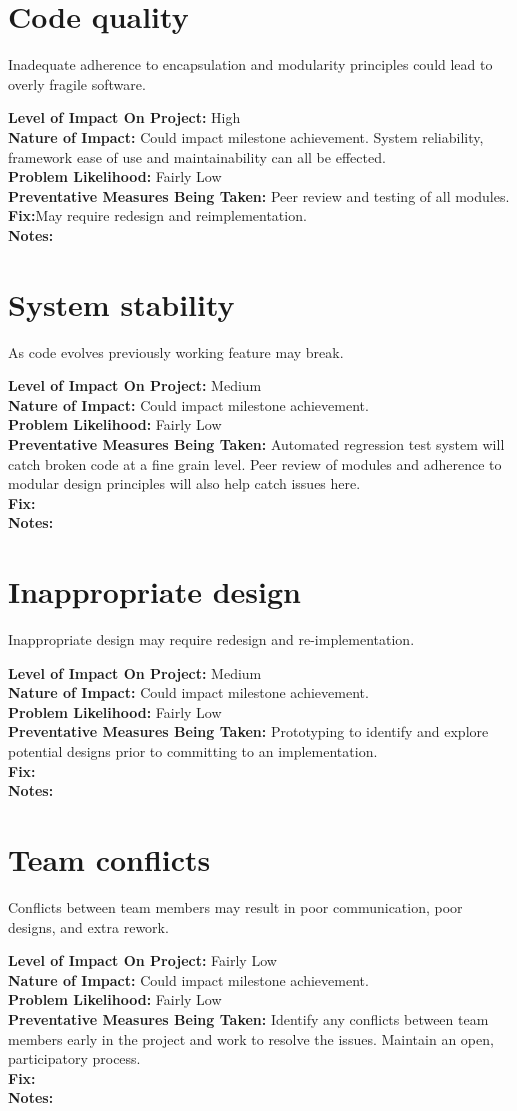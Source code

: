 \documentclass[english]{article}
\newcommand{\req}[1]{\section{\hspace{.2in}#1}}
\newenvironment
{reqlist}
{\begin{list} {} {} \rm \item[]}
{\end{list}}
\begin{document}
\req{Code quality}
Inadequate adherence to encapsulation and modularity principles could
lead to overly fragile software.
\begin{reqlist}
{\bf Level of Impact On Project:} High \\
{\bf Nature of Impact:} Could impact milestone achievement. System reliability, framework ease of use
and maintainability can all be effected.\\
{\bf Problem Likelihood:} Fairly Low \\
{\bf Preventative Measures Being Taken:} Peer review and testing of all modules.
\\
{\bf Fix:}May require redesign and reimplementation.\\
{\bf Notes:} 
\end{reqlist}

\req{System stability}
As code evolves previously working feature may break.
\begin{reqlist}
{\bf Level of Impact On Project:} Medium \\
{\bf Nature of Impact:} Could impact milestone achievement.\\
{\bf Problem Likelihood:} Fairly Low \\
{\bf Preventative Measures Being Taken:} Automated regression test system will catch 
broken code at a fine grain level. Peer review of modules and adherence to modular
design principles will also help catch issues here.
\\
{\bf Fix:}\\
{\bf Notes:} 
\end{reqlist}

\req{Inappropriate design}
Inappropriate design may require redesign and re-implementation.
\begin{reqlist}
{\bf Level of Impact On Project:} Medium \\
{\bf Nature of Impact:} Could impact milestone achievement.\\
{\bf Problem Likelihood:} Fairly Low \\
{\bf Preventative Measures Being Taken:}
Prototyping to identify and explore potential designs prior to committing to
an implementation.
\\
{\bf Fix:}\\
{\bf Notes:} 
\end{reqlist}

\req{Team conflicts}
Conflicts between team members may result in poor communication, poor designs,
and extra rework.
\begin{reqlist}
{\bf Level of Impact On Project:} Fairly Low \\
{\bf Nature of Impact:} Could impact milestone achievement.\\
{\bf Problem Likelihood:} Fairly Low \\
{\bf Preventative Measures Being Taken:}
Identify any conflicts between team members early in the project and work to
resolve the issues. Maintain an open, participatory process.
\\
{\bf Fix:}\\
{\bf Notes:} 
\end{reqlist}
\end{document}
